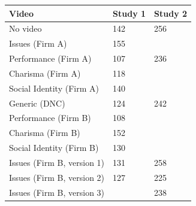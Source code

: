 
\begin{tabular}{lll}
\toprule
Video & Study 1 & Study 2\\
\midrule
No video & 142 & 256\\
Issues (Firm A) & 155 & \\
Performance (Firm A) & 107 & 236\\
Charisma (Firm A) & 118 & \\
Social Identity (Firm A) & 140 & \\
\addlinespace
Generic (DNC) & 124 & 242\\
Performance (Firm B) & 108 & \\
Charisma (Firm B) & 152 & \\
Social Identity (Firm B) & 130 & \\
Issues (Firm B, version 1) & 131 & 258\\
\addlinespace
Issues (Firm B, version 2) & 127 & 225\\
Issues (Firm B, version 3) &  & 238\\
\bottomrule
\end{tabular}
